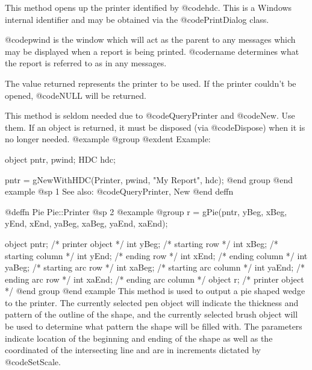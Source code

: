 This method opens up the printer identified by @code{hdc}.  This is
a Windows internal identifier and may be obtained via the
@code{PrintDialog} class.

@code{pwind} is the window which will act as the parent to any
messages which may be displayed when a report is being printed.
@code{rname} determines what the report is referred to as in any
messages.

The value returned represents the printer to be used.  If the 
printer couldn't be opened, @code{NULL} will be returned.

This method is seldom needed due to @code{QueryPrinter} and @code{New}.
Use them. If an object is returned, it must be disposed (via
@code{Dispose}) when it is no longer needed.
@example
@group
@exdent Example:

object  pntr, pwind;
HDC     hdc;

pntr = gNewWithHDC(Printer, pwind, "My Report", hdc);
@end group
@end example
@sp 1
See also:  @code{QueryPrinter, New}
@end deffn



















@deffn {Pie} Pie::Printer
@sp 2
@example
@group
r = gPie(pntr, yBeg, xBeg, yEnd, xEnd, yaBeg, xaBeg, yaEnd, xaEnd);

object  pntr;   /*  printer object         */
int     yBeg;   /*  starting row           */
int     xBeg;   /*  starting column        */
int     yEnd;   /*  ending row             */
int     xEnd;   /*  ending column          */
int     yaBeg;  /*  starting arc row       */
int     xaBeg;  /*  starting arc column    */
int     yaEnd;  /*  ending arc row         */
int     xaEnd;  /*  ending arc column      */
object  r;      /*  printer object         */
@end group
@end example
This method is used to output a pie shaped wedge to the printer.  The
currently selected pen object will indicate the thickness and pattern of
the outline of the shape, and the currently selected brush object will
be used to determine what pattern the shape will be filled with.  The
parameters indicate location of the beginning and ending of the shape as
well as the coordinated of the intersecting line and are in increments
dictated by @code{SetScale}.


